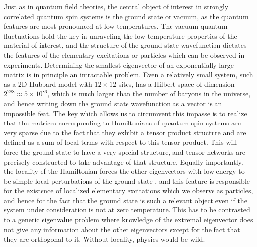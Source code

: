 \documentclass[rmp,aps,reprint,superscriptaddress,nobalancelastpage]{revtex4-1}
\begin{document}
Just as in quantum field theories, the central object of interest in strongly correlated quantum spin systems is the ground state or vacuum, as the quantum features are most pronounced at low temperatures. The vacuum quantum fluctuations hold the key in unraveling the low temperature properties of the material of interest, and the structure of the ground state wavefunction dictates the features of the elementary excitations or particles which can be observed in experiments. Determining the smallest eigenvector of an exponentially large matrix is in principle an intractable problem. Even a relatively small system, such as a 2D Hubbard model with $12\times 12$ sites, has a Hilbert space of dimension $2^{288}\approx 5\times 10^{86}$, which is much larger than the number of baryons in the universe, and hence writing down the ground state wavefunction as a vector is an impossible feat.  The key which allows us to circumvent this impasse is to realize that the matrices corresponding to Hamiltonians of quantum spin systems are very sparse due to the fact that they exhibit a tensor product structure and are defined as a sum of local terms with respect to this tensor product. This will force the ground state to have a very special structure, and tensor networks are precisely constructed to take advantage of that structure. Equally importantly, the locality of the Hamiltonian forces the other eigenvectors with low energy to be simple local perturbations of the ground state \cite{haegeman:mps-ansatz-excitations}, and this feature is responsible for the existence of localized elementary excitations which we observe as particles, and hence for the fact that the ground state is such a relevant object even if the system under consideration is not at zero temperature.  This has to be contrasted to a generic eigenvalue problem where knowledge of the extremal eigenvector does not give any information about the other eigenvectors except for the fact that they are orthogonal to it. Without locality, physics would be wild.
\end{document}
